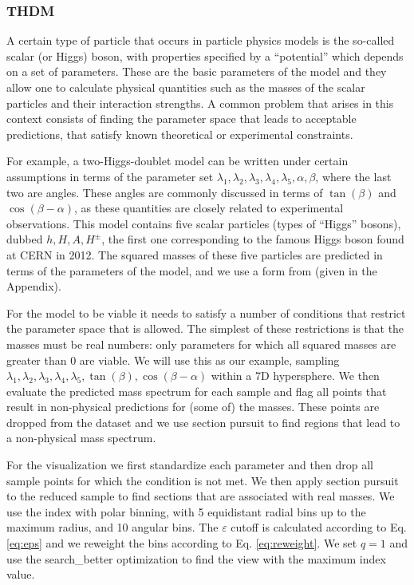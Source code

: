 \documentclass[]{interact}
\theoremstyle{plain}%
\theoremstyle{definition}
\theoremstyle{remark}
\begin{document}
\hypertarget{sec:THDM}{%
\subsubsection*{THDM}\label{sec:THDM}}

A certain type of particle that occurs in particle physics models is the
so-called scalar (or Higgs) boson, with properties specified by a
``potential'' which depends on a set of parameters. These are the basic
parameters of the model and they allow one to calculate physical
quantities such as the masses of the scalar particles and their
interaction strengths. A common problem that arises in this context
consists of finding the parameter space that leads to acceptable
predictions, that satisfy known theoretical or experimental constraints.

For example, a two-Higgs-doublet model can be written under certain
assumptions in terms of the parameter set
\(\lambda_1,\lambda_2,\lambda_3,\lambda_4,\lambda_5,\alpha,\beta\),
where the last two are angles. These angles are commonly discussed in
terms of \(\tan(\beta)\) and \(\cos(\beta-\alpha)\), as these quantities
are closely related to experimental observations. This model contains
five scalar particles (types of ``Higgs'' bosons), dubbed
\(h,H,A,H^\pm\), the first one corresponding to the famous Higgs boson
found at CERN in 2012. The squared masses of these five particles are
predicted in terms of the parameters of the model, and we use a form
from \citet{Gunion:2002zf} (given in the Appendix).

For the model to be viable it needs to satisfy a number of conditions
that restrict the parameter space that is allowed. The simplest of these
restrictions is that the masses must be real numbers: only parameters
for which all squared masses are greater than 0 are viable. We will use
this as our example, sampling
\(\lambda_1,\lambda_2,\lambda_3,\lambda_4,\lambda_5,\tan(\beta),\cos(\beta-\alpha)\)
within a 7D hypersphere. We then evaluate the predicted mass spectrum
for each sample and flag all points that result in non-physical
predictions for (some of) the masses. These points are dropped from the
dataset and we use section pursuit to find regions that lead to a
non-physical mass spectrum.

For the visualization we first standardize each parameter and then drop
all sample points for which the condition is not met. We then apply
section pursuit to the reduced sample to find sections that are
associated with real masses. We use the index with polar binning, with 5
equidistant radial bins up to the maximum radius, and 10 angular bins.
The \(\varepsilon\) cutoff is calculated according to Eq. \ref{eq:eps}
and we reweight the bins according to Eq. \ref{eq:reweight}. We set
\(q=1\) and use the search\_better optimization to find the view with
the maximum index value.
\end{document}
